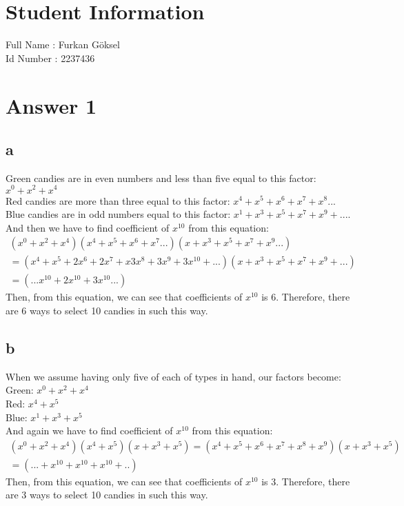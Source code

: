 \documentclass[12pt]{article}
\begin{document}
\section*{Student Information } 
Full Name : Furkan Göksel \\
Id Number : 2237436 \\

\section*{Answer 1}
\subsection*{a} 
Green candies are in even numbers and less than five equal to this factor: $x^0+x^2+x^4$ \\
Red candies are more than three equal to this factor: $x^4+x^5+x^6+x^7+x^8...$ \\
Blue candies are in odd numbers equal to this factor: $x^1+x^3+x^5+x^7+x^9+....$ \\
And then we have to find coefficient of $x^{10}$ from this equation:
\begin{equation} 
\begin{split}
    (x^0+x^2+x^4)(x^4+x^5+x^6+x^7...)(x+x^3+x^5+x^7+x^9...) \\
    =(x^4+x^5+2x^6+2x^7+x3x^8+3x^9+3x^{10}+...)(x+x^3+x^5+x^7+x^9+...) \\
    =(...x^{10}+2x^{10}+3x^{10}...)
\end{split}    
\end{equation}
Then, from this equation, we can see that coefficients of $x^{10}$ is 6. Therefore, there are 6 ways to select 10 candies in such this way.
\subsection*{b}
When we assume having only five of each of types in hand, our factors become:\\
Green: $x^0+x^2+x^4$ \\
Red: $x^4+x^5$ \\
Blue: $x^1+x^3+x^5$ \\
And again we have to find coefficient of $x^{10}$ from this equation:
\begin{equation} 
\begin{split}
    (x^0+x^2+x^4)(x^4+x^5)(x+x^3+x^5) = (x^4+x^5+x^6+x^7+x^8+x^9)(x+x^3+x^5) \\
    =(...+x^{10}+x^{10}+x^{10}+..)
\end{split}    
\end{equation}
Then, from this equation, we can see that coefficients of $x^{10}$ is 3. Therefore, there are 3 ways to select 10 candies in such this way.
\end{document}
